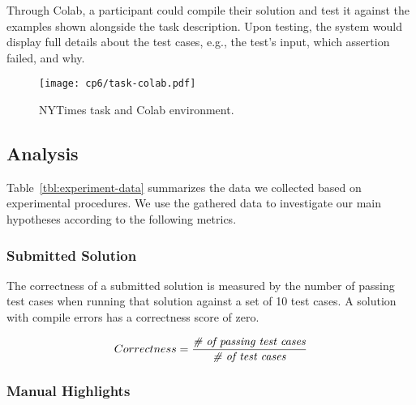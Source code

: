 Through Colab, a participant could compile their solution and test it against the examples shown alongside the task description.
Upon testing, the system would display full details about the test cases, e.g., the test's input, which assertion failed, and why. 




\clearpage

\begin{landscape}
\begin{figure}
    \centering
    \texttt{[image: cp6/task-colab.pdf]}
    \caption{NYTimes task and Colab environment.}
    \label{fig:nytimes-task-colab}
\end{figure}
\end{landscape}

\clearpage


\subsection{Analysis}



Table~\ref{tbl:experiment-data} summarizes the data we collected based on experimental procedures.
We use the gathered data to investigate our main hypotheses according to the following metrics.






\subsubsection{Submitted Solution}

 
The correctness of a submitted solution is measured by the number of passing test cases
when running that solution against a set of 10 test cases. 
A solution with compile errors has a correctness score of zero.


\smallskip
\begin{small}


\begin{equation}
    Correctness = \frac{ \text{\textit{\# of passing test cases}}}{\text{\textit{\#  of test cases}}}
\end{equation}
\end{small}



\subsubsection{Manual Highlights}


